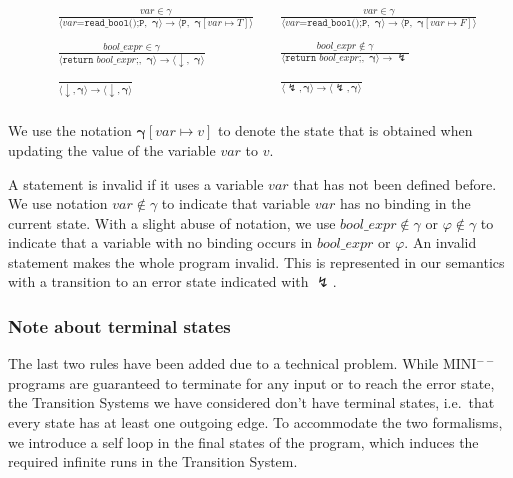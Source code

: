 \documentclass{article}
\begin{document}
\begin{align*}
    &\;\frac{var \in \gamma}{\langle var\texttt{=read\_bool();P}, \, \, \mathbf{\gamma} \rangle \rightarrow \langle \texttt{P}, \, \, \mathbf{\gamma}[var \mapsto T] \rangle} &&\;
       \frac{var \in \gamma}{\langle var\texttt{=read\_bool();P}, \, \, \mathbf{\gamma} \rangle \rightarrow \langle \texttt{P}, \, \, \mathbf{\gamma}[var \mapsto F] \rangle }\\ \\
    &\;\frac{bool\_expr \in \gamma}{\langle \texttt{return } bool\_expr\texttt{;}, \, \, \mathbf{\gamma} \rangle \rightarrow \langle \downarrow, \, \, \mathbf{\gamma} \rangle} &&\;
       \frac{bool\_expr \notin \gamma}{\langle \texttt{return } bool\_expr\texttt{;}, \, \, \mathbf{\gamma} \rangle \rightarrow \lightning} \\ \\
    &\;\frac{}{\langle \downarrow, \mathbf{\gamma} \rangle \rightarrow \langle \downarrow, \mathbf{\gamma} \rangle} &&\;
       \frac{}{\langle \lightning, \mathbf{\gamma} \rangle \rightarrow \langle \lightning, \mathbf{\gamma} \rangle} \\
\end{align*}

We use the notation $\mathbf{\gamma}[var \mapsto v]$ to denote the state that is obtained 
when updating the value of the variable $var$ to $v$. 

A statement is invalid if it uses a variable $var$ that has not been defined before.
We use notation $var \notin \gamma$ to indicate that variable $var$ has no binding in 
the current state. With a slight abuse of notation, we use $bool\_expr \notin \gamma$ or $\varphi \notin \gamma$
to indicate that a variable with no binding occurs in $bool\_expr$ or $\varphi$. An invalid statement makes the
whole program invalid. This is represented in our semantics with a transition 
to an error state indicated with $\lightning$.

\subsubsection*{Note about terminal states}
The last two rules have been added due to a technical problem. 
While MINI$^{--}$ programs are guaranteed to terminate for any input or to reach the error state, 
the Transition Systems we have considered don't have terminal states, i.e.~that every state has at least one outgoing edge. 
To accommodate the two formalisms, we introduce a self loop in the final states of the program, 
which induces the required infinite runs in the Transition System.
\end{document}
